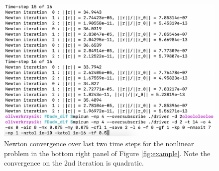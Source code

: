 \documentclass[review]{siamart}
\begin{document}
\begin{figure}
\centerline{
\includegraphics[width = 1\textwidth]{../figures/solves}
}
\caption{Newton convergence over last two time steps for the nonlinear problem in the bottom right panel of Figure \ref{fig:example}. Note the convergence on the 2nd iteration is quadratic.
\label{fig:solves}
}
\end{figure}

% 
% 
\end{document}
